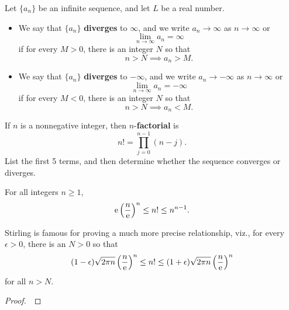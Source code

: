 \begin{definition}
Let $\{a_n\}$ be an infinite sequence, and let $L$ be a real number.
\begin{itemize}
\item We say that $\{a_n\}$ \textbf{diverges} to $\infty$, and we write $a_n\to\infty$ as $n\to\infty$ or
\begin{equation*}
\lim_{n\to\infty}a_n = \infty
\end{equation*}
if for every $M>0$, there is an integer $N$ so that
\begin{equation*}
n>N\implies a_n>M.
\end{equation*}
\item We say that $\{a_n\}$ \textbf{diverges} to $-\infty$, and we write $a_n\to -\infty$ as $n\to\infty$ or
\begin{equation*}
\lim_{n\to\infty}a_n = -\infty
\end{equation*}
if for every $M<0$, there is an integer $N$ so that
\begin{equation*}
n>N\implies a_n<M.
\end{equation*}
\end{itemize}
\end{definition}

\begin{example}
If $n$ is a nonnegative integer, then $n$-\textbf{factorial} is 
\begin{equation*}
n! = \prod_{j=0}^{n-1}\left(n-j\right).
\end{equation*}
List the first 5 terms, and then determine whether the sequence converges or diverges.
\end{example}

\newpage

\begin{theorem}
For all integers $n\ge 1$, 
\begin{equation*}
\mathrm{e}\left(\frac{n}{\mathrm{e}}\right)^n\le n!\le n^{n-1}.
\end{equation*}
\end{theorem}
\begin{remark}
Stirling is famous for proving a much more precise relationship, viz., for every $\epsilon>0$, there is an $N>0$ so that
\begin{equation*}
(1-\epsilon) \sqrt{2\pi n}\left(\frac{n}{\mathrm{e}}\right)^n\le n!\le (1+\epsilon) \sqrt{2\pi n}\left(\frac{n}{\mathrm{e}}\right)^n
\end{equation*}
for all $n>N$.
\end{remark}
\begin{proof}\,

\vspace{6in}
\end{proof}



